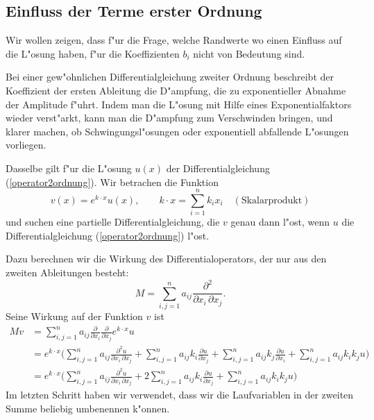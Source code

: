 \subsection{Einfluss der Terme erster Ordnung
\label{einfluss-terme-erster-ordnung}}
Wir wollen zeigen, dass f"ur die Frage, welche Randwerte wo einen
Einfluss auf die L"osung haben, f"ur die Koeffizienten $b_i$ nicht
von Bedeutung sind.

Bei einer gew"ohnlichen Differentialgleichung zweiter Ordnung beschreibt
der Koeffizient der ersten Ableitung die D"ampfung, die zu exponentieller
Abnahme der Amplitude f"uhrt.
Indem man die L"osung mit Hilfe eines Exponentialfaktors wieder verst"arkt,
kann man die D"ampfung zum Verschwinden bringen, und klarer machen,
ob Schwingungsl"osungen oder exponentiell abfallende L"osungen vorliegen.

Dasselbe gilt f"ur die L"osung $u(x)$ der Differentialgleichung
(\ref{operator2ordnung}).
Wir betrachen die Funktion
\[
v(x)=e^{k\cdot x} u(x),
\qquad
k\cdot x = \sum_{i=1}^n k_ix_i \quad(\text{Skalarprodukt})
\]
und suchen eine partielle Differentialgleichung, die $v$ genau dann l"ost,
wenn $u$ die Differentialgleichung
(\ref{operator2ordnung}) l"ost.

Dazu berechnen wir die Wirkung des Differentialoperators, der nur 
aus den zweiten Ableitungen besteht:
\[
M=\sum_{i,j=1}^n a_{ij}\frac{\partial^2}{\partial x_i\,\partial x_j}.
\]
Seine Wirkung auf der Funktion $v$ ist
\begin{align*}
Mv
&=
\sum_{i,j=1}^na_{ij}
\frac{\partial}{\partial x_i}
\frac{\partial}{\partial x_j} e^{k\cdot x}u
\\
&=
e^{k\cdot x}
\biggl(
\sum_{i,j=1}^na_{ij}
\frac{\partial^2 u}{\partial x_i\,\partial x_j}
+
\sum_{i,j=1}^n a_{ij}k_i\frac{\partial u}{\partial x_j}
+
\sum_{i,j=1}^n a_{ij}k_j\frac{\partial u}{\partial x_i}
+
\sum_{i,j=1}^n a_{ij}k_ik_ju
\biggr)
\\
&=
e^{k\cdot x}
\biggl(
\sum_{i,j=1}^na_{ij}
\frac{\partial^2 u}{\partial x_i\,\partial x_j}
+
2\sum_{i,j=1}^n a_{ij}k_i\frac{\partial u}{\partial x_j}
+
\sum_{i,j=1}^n a_{ij}k_ik_ju
\biggr)
\end{align*}
Im letzten Schritt haben wir verwendet, dass wir die Laufvariablen
in der zweiten Summe beliebig umbenennen k"onnen.


